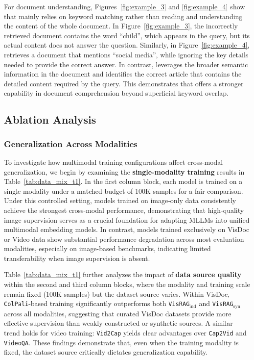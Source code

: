 For document understanding, Figures~\ref{fig:example_3} and \ref{fig:example_4} show that \vlmvec mainly relies on keyword matching rather than reading and understanding the content of the whole document. In Figure~\ref{fig:example_3}, the incorrectly retrieved document contains the word ``child'', which appears in the query, but its actual content does not answer the question. Similarly, in Figure~\ref{fig:example_4}, \vlmvec retrieves a document that mentions ``social media'', while ignoring the key details needed to provide the correct answer. In contrast, \model leverages the broader semantic information in the document and identifies the correct article that contains the detailed content required by the query. This demonstrates that \model offers a stronger capability in document comprehension beyond superficial keyword overlap.




\subsection{Ablation Analysis}
\subsubsection{Generalization Across Modalities}
\label{sec:modality_generalization}

To investigate how multimodal training configurations affect cross-modal generalization, we begin by examining the \textbf{single-modality training} results in Table~\ref{tab:data_mix_t1}. In the first column block, each model is trained on a single modality under a matched budget of 100K samples for a fair comparison. Under this controlled setting, models trained on image-only data consistently achieve the strongest cross-modal performance, demonstrating that high-quality image supervision serves as a crucial foundation for adapting MLLMs into unified multimodal embedding models. In contrast, models trained exclusively on VisDoc or Video data show substantial performance degradation across most evaluation modalities, especially on image-based benchmarks, indicating limited transferability when image supervision is absent.

Table~\ref{tab:data_mix_t1} further analyzes the impact of \textbf{data source quality} within the second and third column blocks, where the modality and training scale remain fixed (100K samples) but the dataset source varies. Within VisDoc, \texttt{ColPali}-based training significantly outperforms both \texttt{VisRAG$_{\text{ind}}$} and \texttt{VisRAG$_{\text{syn}}$} across all modalities, suggesting that curated VisDoc datasets provide more effective supervision than weakly constructed or synthetic sources. A similar trend holds for video training: \texttt{Vid2Cap} yields clear advantages over \texttt{Cap2Vid} and \texttt{VideoQA}. These findings demonstrate that, even when the training modality is fixed, the dataset source critically dictates generalization capability.


